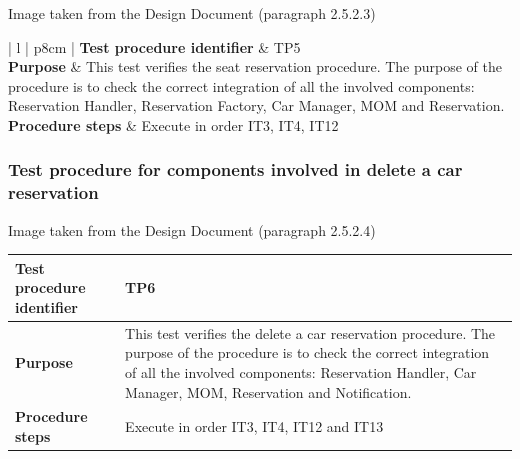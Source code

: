 \documentclass{article}
\begin{document}
				\begin{center}
					Image taken from the Design Document (paragraph 2.5.2.3)
				\end{center}
				\begin{center}
					\setlength{\tabcolsep}{24pt}
					\renewcommand{\arraystretch}{1.4}
					\begin{tabular}{ | l | p{8cm} |}\hline
						\textbf{Test procedure identifier} & TP5\\\hline
						\textbf{Purpose} & This test verifies the seat reservation procedure. The purpose of the procedure is to check the correct integration of all the involved components: Reservation Handler, Reservation Factory, Car Manager, MOM and Reservation. \\\hline
						\textbf{Procedure steps} & Execute in order IT3, IT4, IT12 \\\hline
					\end{tabular}
				\end{center}
				\pagebreak
			\subsubsection{Test procedure for components involved in delete a car reservation} \label{sec:3.2.5}
			\begin{minipage}{\linewidth}
			\end{minipage}
			\begin{center}
				Image taken from the Design Document (paragraph 2.5.2.4)
			\end{center}
			\begin{center}
				\setlength{\tabcolsep}{24pt}
				\renewcommand{\arraystretch}{1.4}
				\begin{tabular}{ | l | p{8cm} |}\hline
					\textbf{Test procedure identifier} & TP6\\\hline
					\textbf{Purpose} & This test verifies the delete a car reservation procedure. The purpose of the procedure is to check the correct integration of all the involved components: Reservation Handler, Car Manager, MOM, Reservation and Notification. \\\hline
					\textbf{Procedure steps} & Execute in order IT3, IT4, IT12 and IT13 \\\hline
				\end{tabular}
			\end{center}
			\pagebreak
\end{document}
